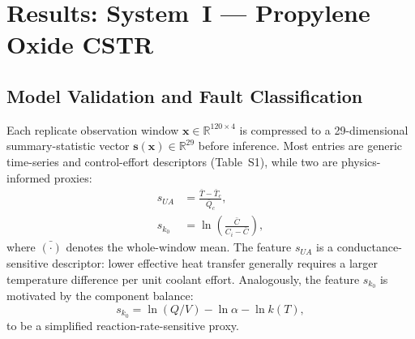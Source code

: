 \documentclass[aps,pre,twocolumn,superscriptaddress,floatfix]{revtex4-2}
\begin{document}
\section{Results: System~I --- Propylene Oxide CSTR}
\label{sec:results_system1}


\subsection{Model Validation and Fault Classification}
\label{sec:snapshot_classification}

Each replicate observation window $\mathbf{x}\in\mathbb{R}^{120\times4}$ is 
compressed to a 29-dimensional
summary-statistic vector $\mathbf{s}(\mathbf{x})\in\mathbb{R}^{29}$ before inference. 
Most entries are
generic time-series and control-effort descriptors (Table~S1), 
while two are physics-informed proxies:
%
\begin{align}
  s_{U\!A} &= \frac{\bar{T}-\bar{T}_c}{\bar{Q}_c},
  \label{eq:ua_proxy}\\[4pt]
  s_{k_0} &= \ln\!\left(\frac{\bar{C}}{C_i - \bar{C}}\right),
  \label{eq:k0_proxy}
\end{align}
where $\bar{(\cdot)}$ denotes the whole-window mean.
The feature $s_{U\!A}$ is a conductance-sensitive descriptor: 
lower effective heat transfer generally requires a larger temperature
difference per unit coolant effort. Analogously, the feature $s_{k_0}$ is
motivated by the component balance:
\begin{equation} 
  s_{k_0} = \ln(Q/V)-\ln\alpha-\ln k(T), 
  \label{eq:k0_proxy_interpretation} 
\end{equation}
to be a simplified reaction-rate-sensitive proxy.
\end{document}

